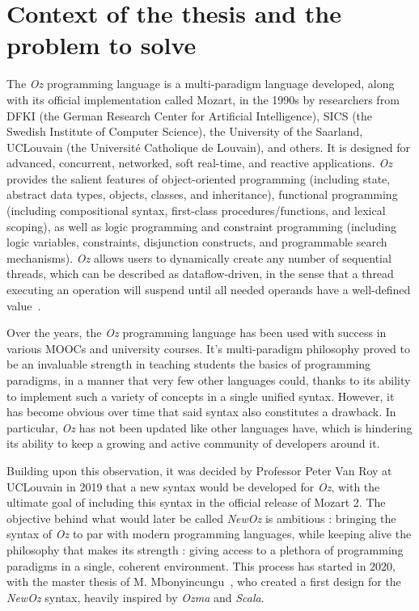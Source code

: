 
\section{Context of the thesis and the problem to solve}\label{sec:ch1-context}
The \textit{Oz} programming language is a multi-paradigm language developed, along with its official implementation called Mozart, in the 1990s by researchers from DFKI (the German Research Center for Artificial Intelligence), SICS (the Swedish Institute of Computer Science), the University of the Saarland, UCLouvain (the Université Catholique de Louvain), and others.
It is designed for advanced, concurrent, networked, soft real-time, and reactive applications.
\textit{Oz} provides the salient features of object-oriented programming (including state, abstract data types, objects, classes, and inheritance),
functional programming (including compositional syntax, first-class procedures/functions, and lexical scoping), as well as
logic programming and constraint programming (including logic variables, constraints, disjunction constructs, and programmable search mechanisms).
\textit{Oz} allows users to dynamically create any number of sequential threads, which can be described as dataflow-driven, in the sense that a thread executing an operation will suspend until all needed operands have a well-defined value~\cite{mozart2tutorial}.\newline

Over the years, the \textit{Oz} programming language has been used with success in various MOOCs and university courses.
It's multi-paradigm philosophy proved to be an invaluable strength in teaching students the basics of programming paradigms, in a manner that very few other languages could, thanks to its ability to implement such a variety of concepts in a single unified syntax.
However, it has become obvious over time that said syntax also constitutes a drawback.
In particular, \textit{Oz} has not been updated like other languages have, which is hindering its ability to keep a growing and active community of developers around it.\newline

Building upon this observation, it was decided by Professor Peter Van Roy at UCLouvain in 2019 that a new syntax would be developed for \textit{Oz}, with the ultimate goal of including this syntax in the official release of Mozart 2.
The objective behind what would later be called \textit{NewOz} is ambitious : bringing the syntax of \textit{Oz} to par with modern programming languages, while keeping alive the philosophy that makes its strength : giving access to a plethora of programming paradigms in a single, coherent environment.
This process has started in 2020, with the master thesis of M. Mbonyincungu~\cite{jpthesis}, who created a first design for the \textit{NewOz} syntax, heavily inspired by \textit{Ozma} and \textit{Scala}.\newline

